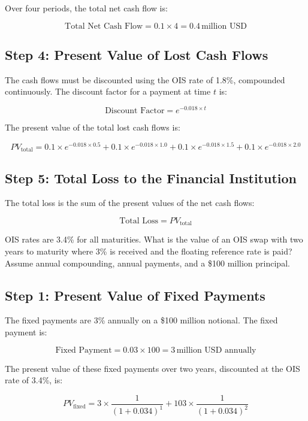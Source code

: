 \documentclass[12pt,letterpaper, onecolumn]{exam}
\begin{document}
\begin{questions}
\begin{solution}
Over four periods, the total net cash flow is:

\[
\text{Total Net Cash Flow} = 0.1 \times 4 = 0.4 \, \text{million USD}
\]

\subsection*{Step 4: Present Value of Lost Cash Flows}
The cash flows must be discounted using the OIS rate of 1.8\%, compounded continuously. The discount factor for a payment at time \(t\) is:

\[
\text{Discount Factor} = e^{-0.018 \times t}
\]

The present value of the total lost cash flows is:

\[
PV_{\text{total}} = 0.1 \times e^{-0.018 \times 0.5} + 0.1 \times e^{-0.018 \times 1.0} + 0.1 \times e^{-0.018 \times 1.5} + 0.1 \times e^{-0.018 \times 2.0}
\]

\subsection*{Step 5: Total Loss to the Financial Institution}
The total loss is the sum of the present values of the net cash flows:

\[
\text{Total Loss} = PV_{\text{total}}
\]


\end{solution}


    \newpage
    \question OIS rates are 3.4\% for all maturities. What is the value of an OIS swap with two years to maturity where 3\% is received and the floating reference rate is paid? Assume annual compounding, annual payments, and a \$100 million principal.

    \begin{solution}
\subsection*{Step 1: Present Value of Fixed Payments}
The fixed payments are 3\% annually on a \$100 million notional. The fixed payment is:

\[
\text{Fixed Payment} = 0.03 \times 100 = 3 \, \text{million USD annually}
\]

The present value of these fixed payments over two years, discounted at the OIS rate of 3.4\%, is:

\[
PV_{\text{fixed}} = 3 \times \frac{1}{(1 + 0.034)^1} + 103 \times \frac{1}{(1 + 0.034)^2}
\]


\end{solution}
\end{questions}
\end{document}
